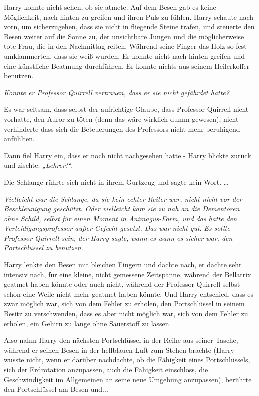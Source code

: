 {Harry konnte nicht sehen, ob sie atmete. Auf dem Besen gab es keine Möglichkeit, nach hinten zu greifen und ihren Puls zu fühlen. Harry schaute nach vorn, um sicherzugehen, dass sie nicht in fliegende Steine trafen, und steuerte den Besen weiter auf die Sonne zu, der unsichtbare Jungen und die möglicherweise tote Frau, die in den Nachmittag reiten. Während seine Finger das Holz so fest umklammerten, dass sie weiß wurden. Er konnte nicht nach hinten greifen und eine künstliche Beatmung durchführen. Er konnte nichts aus seinem Heilerkoffer benutzen.

\emph{Konnte er Professor Quirrell vertrauen, dass er sie nicht gefährdet hatte?}

Es war seltsam, dass selbst der aufrichtige Glaube, dass Professor Quirrell nicht vorhatte, den Auror zu töten (denn das wäre wirklich dumm gewesen), nicht verhinderte dass sich die Beteuerungen des Professors nicht mehr beruhigend anfühlten.

Dann fiel Harry ein, dass er noch nicht nachgesehen hatte - Harry blickte zurück und zischte: „\emph{Lehrer}?“.

Die Schlange rührte sich nicht in ihrem Gurtzeug und sagte kein Wort. …

\emph{Vielleicht war die Schlange, da sie kein echter Reiter war, nicht nicht vor der Beschleunigung geschützt. Oder vielleicht kam sie zu nah an die Dementoren ohne Schild, selbst für einen Moment in Animagus-Form, und das hatte den Verteidigungsprofessor außer Gefecht gesetzt. Das war nicht gut}. \emph{Es sollte Professor Quirrell sein, der Harry sagte, wann es wann es sicher war, den Portschlüssel zu benutzen.}

Harry lenkte den Besen mit bleichen Fingern und dachte nach, er dachte sehr intensiv nach, für eine kleine, nicht gemessene Zeitspanne, während der Bellatrix geatmet haben könnte oder auch nicht, während der Professor Quirrell selbst schon eine Weile nicht mehr geatmet haben könnte. Und Harry entschied, dass es zwar möglich war, sich von dem Fehler zu erholen, den Portschlüssel in seinem Besitz zu verschwenden, dass es aber nicht möglich war, sich von dem Fehler zu erholen, ein Gehirn zu lange ohne Sauerstoff zu lassen.

Also nahm Harry den nächsten Portschlüssel in der Reihe aus seiner Tasche, während er seinen Besen in der hellblauen Luft zum Stehen brachte (Harry wusste nicht, wenn er darüber nachdachte, ob die Fähigkeit eines Portschlüssels, sich der Erdrotation anzupassen, auch die Fähigkeit einschloss, die Geschwindigkeit im Allgemeinen an seine neue Umgebung anzupassen), berührte den Portschlüssel am Besen und...

}
